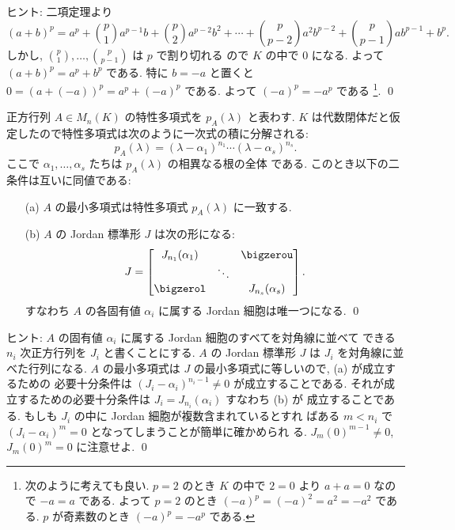 \documentclass[12pt,twoside]{jarticle}
\begin{document}
\noindent
ヒント: 二項定理より
\begin{equation*}
  (a+b)^p = 
  a^p + \binom{p}{1}a^{p-1}b + \binom{p}{2}a^{p-2}b^2
  + \cdots + \binom{p}{p-2}a^2b^{p-2} + \binom{p}{p-1}ab^{p-1} + b^p.
\end{equation*}
しかし, $\binom{p}{1},\dots,\binom{p}{p-1}$ は $p$ で割り切れる
ので $K$ の中で $0$ になる.  よって $(a+b)^p=a^p+b^p$ である.
特に $b=-a$ と置くと $0 = (a+(-a))^p=a^p+(-a)^p$ である.
よって $(-a)^p=-a^p$ である%
\footnote{次のように考えても良い. 
  $p=2$ のとき $K$ の中で $2=0$ より $a+a=0$ なので $-a=a$ である.
  よって $p=2$ のとき $(-a)^p=(-a)^2=a^2=-a^2$ である.  
  $p$ が奇素数のとき $(-a)^p=-a^p$ である.}.
\qed


\begin{question}
\label{q:Jordan-varphi=p}
  正方行列 $A\in M_n(K)$ の特性多項式を $p_A(\lambda)$ と表わす.
  $K$ は代数閉体だと仮定したので特性多項式は次のように一次式の積に分解される:
  \begin{equation*}
    p_A(\lambda) = (\lambda-\alpha_1)^{n_1}\cdots(\lambda-\alpha_s)^{n_s}.
  \end{equation*}
  ここで $\alpha_1,\dots,\alpha_s$ たちは $p_A(\lambda)$ の相異なる根の全体
  である.  このとき以下の二条件は互いに同値である:
  \begin{enumerate}
  \item[(a)] $A$ の最小多項式は特性多項式 $p_A(\lambda)$ に一致する.
  \item[(b)] $A$ の Jordan 標準形 $J$ は次の形になる:
    \begin{equation*}
      J = 
      \begin{bmatrix}
        J_{n_1}(\alpha_1) &        & \bigzerou \\
                          & \ddots & \\
        \bigzerol         &        & J_{n_s}(\alpha_s) \\
      \end{bmatrix}.
    \end{equation*}
    すなわち $A$ の各固有値 $\alpha_i$ に属する Jordan 細胞は唯一つになる.
    \qed
  \end{enumerate}
\end{question}

\noindent
ヒント: $A$ の固有値 $\alpha_i$ に属する Jordan 細胞のすべてを対角線に並べて
できる $n_i$ 次正方行列を $J_i$ と書くことにする.  
$A$ の Jordan 標準形 $J$ は $J_i$ を対角線に並べた行列になる.  
$A$ の最小多項式は $J$ の最小多項式に等しいので, (a) が成立するための
必要十分条件は $(J_i-\alpha_i)^{n_i-1}\ne 0$ が成立することである.  
それが成立するための必要十分条件は $J_i=J_{n_i}(\alpha_i)$ すなわち (b) が
成立することである.  もしも $J_i$ の中に Jordan 細胞が複数含まれているとすれ
ばある $m<n_i$ で $(J_i-\alpha_i)^m=0$ となってしまうことが簡単に確かめられ
る.  $J_m(0)^{m-1}\ne 0$, $J_m(0)^m=0$ に注意せよ.
\qed
\end{document}
